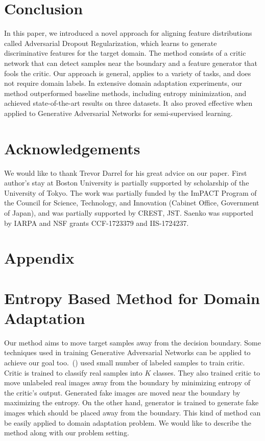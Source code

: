 \documentclass{article} \usepackage{iclr2018_conference,times}
\begin{document}
\vspace{-2mm}        
\section{Conclusion}
\vspace{-3mm}        
In this paper, we introduced a novel approach for aligning feature distributions called Adversarial Dropout Regularization, which learns to generate discriminative features for the target domain. The method consists of a critic network that can detect  samples near the boundary and a feature generator that fools the critic. Our approach is general, applies to a variety of tasks, and does not require domain labels.
In extensive domain adaptation experiments, our method outperformed baseline methods, including entropy minimization, and achieved state-of-the-art results on three datasets. It also proved effective when applied to  Generative Adversarial Networks for semi-supervised learning. 
\section{Acknowledgements}
We would like to thank Trevor Darrel for his great advice on our paper. First author's stay at Boston University is partially supported by scholarship of the University of Tokyo.
The work was partially funded by the ImPACT Program of the Council for Science, Technology, and Innovation
(Cabinet Office, Government of Japan), and was partially supported by CREST, JST. Saenko was supported by IARPA and NSF grants CCF-1723379 and IIS-1724237.




\appendix

\section*{Appendix}
\vspace{-3mm}
\section{Entropy Based Method for Domain Adaptation}
\label{append:ent}
\vspace{-3mm}
Our method aims to move target samples away from the decision boundary. Some techniques used in training Generative Adversarial Networks can be applied to achieve our goal too.~(\cite{springenberg2015unsupervised,salimans2016improved}) used small number of labeled samples to train critic. Critic is trained to classify real samples into $K$ classes. They also trained critic to move unlabeled real images away from the boundary by minimizing entropy of the critic's output. Generated fake images are moved near the boundary by maximizing the entropy. On the other hand, generator is trained to generate fake images which should be placed away from the boundary.
This kind of method can be easily applied to domain adaptation problem. We would like to describe the method along with our problem setting.
\end{document}
